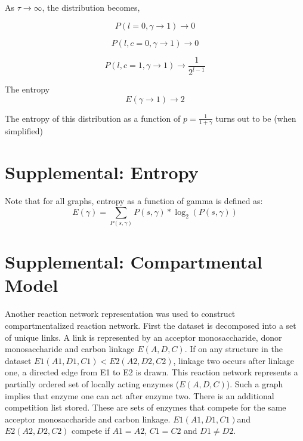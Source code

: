 \documentclass{article}
\begin{document}
As $\tau \rightarrow\infty$, the distribution becomes,

\begin{equation}
P(l=0,\gamma\rightarrow 1)\rightarrow 0
\end{equation}

\begin{equation}
P(l, c=0, \gamma\rightarrow 1)\rightarrow 0
\end{equation}

\begin{equation}
P(l, c=1, \gamma\rightarrow 1) \rightarrow \frac{1}{2^{l-1}}
\end{equation}

The entropy
\begin{equation}
E(\gamma\rightarrow 1)\rightarrow 2
\end{equation}

The entropy of this distribution as a function of $p=\frac{1}{1+\gamma}$ turns out to be (when simplified)

\section*{Supplemental: Entropy}
Note that for all graphs, entropy as a function of gamma is defined as:
\begin{equation}
E(\gamma)=\sum_{P(s,\gamma)}P(s,\gamma)*\log_2(P(s,\gamma))
\end{equation}


\section*{Supplemental: Compartmental Model}
Another reaction network representation was used to construct compartmentalized reaction network. First the dataset is decomposed into a set of unique links. A link is represented by an acceptor monosaccharide, donor monosaccharide and carbon linkage $E(A,D,C)$. If on any structure in the dataset $E1(A1,D1,C1)<E2(A2,D2,C2)$, linkage two occurs after linkage one, a directed edge from E1 to E2 is drawn. This reaction network represents a partially ordered set of locally acting enzymes ($E(A,D,C)$). Such a graph implies that enzyme one can act after enzyme two. There is an additional competition list stored. These are sets of enzymes that compete for the same acceptor monosaccharide and carbon linkage. $E1(A1,D1,C1)$and $E2(A2,D2,C2)$ compete if $A1=A2$, $C1=C2$ and $D1\neq D2$.
\end{document}
